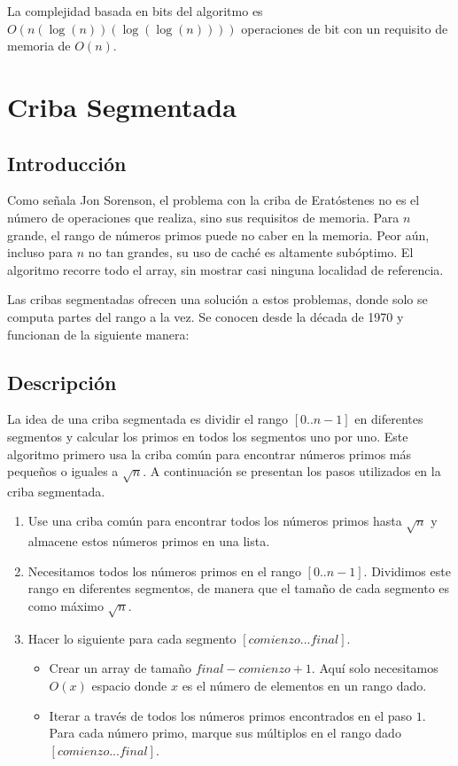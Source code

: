 \documentclass[12pt]{article}
\newcommand{\nl}{\vspace{0.3cm}}
\begin{document}
\nl

La complejidad basada en bits del algoritmo es $O(n(\log(n)) (\log(\log(n))))$ operaciones de bit con un requisito de memoria de $O(n)$.\cite{lpnsaft}

\section{Criba Segmentada}

\subsection{Introducción}

\nl

Como señala Jon Sorenson, el problema con la criba de Eratóstenes no es el número de operaciones que realiza, sino sus requisitos de memoria.\cite{aipns} Para $n$ grande, el rango de números primos puede no caber en la memoria. Peor aún, incluso para $n$ no tan grandes, su uso de caché es altamente subóptimo. El algoritmo recorre todo el array, sin mostrar casi ninguna localidad de referencia.

\newpage

Las cribas segmentadas ofrecen una solución a estos problemas, donde solo se computa partes del rango a la vez.\cite{pnap} Se conocen desde la década de 1970 y funcionan de la siguiente manera:\cite{aipns}\cite{ssepap}

\subsection{Descripción}

\nl

La idea de una criba segmentada es dividir el rango $[0 .. n-1]$ en diferentes segmentos y calcular los primos en todos los segmentos uno por uno. Este algoritmo primero usa la criba común para encontrar números primos más pequeños o iguales a $\sqrt{n}$. A continuación se presentan los pasos utilizados en la criba segmentada.\cite{gfgss}

\begin{enumerate}
	\item Use una criba común para encontrar todos los números primos hasta $\sqrt{n}$ y almacene estos números primos en una lista.
	\item Necesitamos todos los números primos en el rango $[0..n-1]$. Dividimos este rango en diferentes segmentos, de manera que el tamaño de cada segmento es como máximo $\sqrt{n}$.
	\item Hacer lo siguiente para cada segmento $[comienzo ... final]$.
	\begin{itemize}
		\item Crear un array de tamaño $final - comienzo + 1$. Aquí solo necesitamos $O(x)$ espacio donde $x$ es el número de elementos en un rango dado.
		\item Iterar a través de todos los números primos encontrados en el paso $1$. Para cada número primo, marque sus múltiplos en el rango dado $[comienzo ... final]$.
	\end{itemize}
\end{enumerate}
\end{document}
